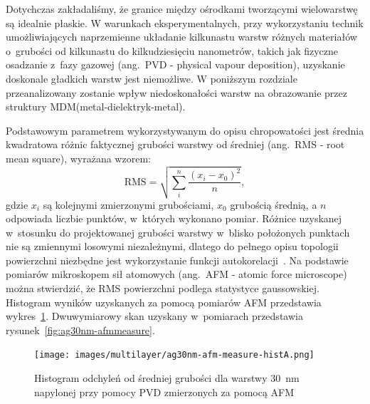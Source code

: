 Dotychczas zakładaliśmy, że granice między ośrodkami tworzącymi wielowarstwę są idealnie płaskie. W warunkach eksperymentalnych, przy wykorzystaniu technik umożliwiających naprzemienne układanie kilkunastu warstw różnych materiałów o~grubości od kilkunastu do kilkudziesięciu nanometrów,  takich jak fizyczne osadzanie z~fazy gazowej (ang.~PVD - physical vapour deposition), uzyskanie doskonale gładkich warstw jest niemożliwe. W poniższym rozdziale przeanalizowany zostanie wpływ niedoskonałości warstw na obrazowanie przez struktury MDM(metal-dielektryk-metal).

Podstawowym parametrem wykorzystywanym do opisu chropowatości jest średnia kwadratowa różnic faktycznej grubości warstwy od średniej (ang.~RMS - root mean square), wyrażana wzorem:
\begin{equation}
\textrm{RMS}=\sqrt{\sum_i^n \frac{(x_i -x_0)^2}{n}},
\end{equation}
gdzie $x_i$ są kolejnymi zmierzonymi grubościami, $x_0$ grubością średnią, a $n$ odpowiada liczbie punktów, w~których wykonano pomiar. Różnice uzyskanej w~stosunku do projektowanej grubości warstwy w~blisko położonych punktach nie są zmiennymi losowymi niezależnymi, dlatego do pełnego opisu topologii powierzchni niezbędne jest wykorzystanie funkcji autokorelacji~\cite{stefaniuk2011effect}. Na podstawie pomiarów mikroskopem sił atomowych (ang.~AFM - atomic force microscope) można stwierdzić, że RMS powierzchni podlega statystyce gaussowskiej. Histogram wyników uzyskanych za pomocą pomiarów AFM przedstawia wykres~\ref{fig:ag30nm-afmhist}. Dwuwymiarowy skan uzyskany w~pomiarach przedstawia rysunek~\ref{fig:ag30nm-afmmeasure}.

\begin{figure}[bt]
		\texttt{[image: images/multilayer/ag30nm-afm-measure-histA.png]}
		\caption{Histogram odchyleń od średniej grubości dla warstwy $30$~nm napylonej przy pomocy PVD zmierzonych za pomocą AFM} 		\label{fig:ag30nm-afmhist}
\end{figure}

